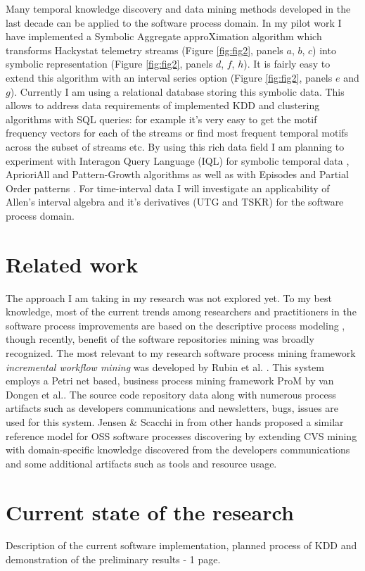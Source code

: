 \documentclass[11pt,oneside]{article}
\begin{document}
Many temporal knowledge discovery and data mining methods developed in the last decade can be applied to the software process domain. In my pilot work I have implemented a Symbolic Aggregate approXimation algorithm \cite{citeulike:2821475} which transforms Hackystat telemetry streams (Figure \ref{fig:fig2}, panels $a$, $b$, $c$) into symbolic representation (Figure \ref{fig:fig2}, panels $d$, $f$, $h$). It is fairly easy to extend this algorithm with an interval series option (Figure \ref{fig:fig2}, panels $e$ and $g$). Currently I am using a relational database storing this symbolic data. This allows to address data requirements of implemented KDD and clustering algorithms with SQL queries: for example it's very easy to get the motif frequency vectors for each of the streams or find most frequent temporal motifs across the subset of streams etc. By using this rich data field I am planning to experiment with Interagon Query Language (IQL) for symbolic temporal data \cite{citeulike:5043086}, AprioriAll \cite{citeulike:775528} and Pattern-Growth algorithms \cite{citeulike:5043097} as well as with Episodes \cite{citeulike:5043099} and Partial Order patterns \cite{citeulike:5043101}. For time-interval data I will investigate an applicability of Allen's interval algebra \cite{citeulike:191348} and it's derivatives (UTG \cite{citeulike:5043086} and TSKR\cite{citeulike:3978076}) for the software process domain. 

\section{Related work}
The approach I am taking in my research was not explored yet. To my best knowledge, most of the current trends among researchers and practitioners in the software process improvements are based on the descriptive process modeling \cite{citeulike:5043670}, though recently, benefit of the software repositories mining \cite{citeulike:5043676} was broadly recognized. The most relevant to my research software process mining framework \textit{incremental workflow mining} was developed by Rubin et al. \cite{citeulike:1885717}. This system employs a Petri net based, business process mining framework ProM by van Dongen et al.\cite{citeulike:5043673}. The source code repository data along with numerous process artifacts such as developers communications and newsletters, bugs, issues are used for this system. Jensen \& Scacchi in \cite{citeulike:5043664} from other hands proposed a similar reference model for OSS software processes discovering by extending CVS mining with domain-specific knowledge discovered from the developers communications and some additional artifacts such as tools and resource usage. 

\section{Current state of the research}
Description of the current software implementation, planned process of KDD and demonstration of the preliminary results - 1 page.



\end{document}
